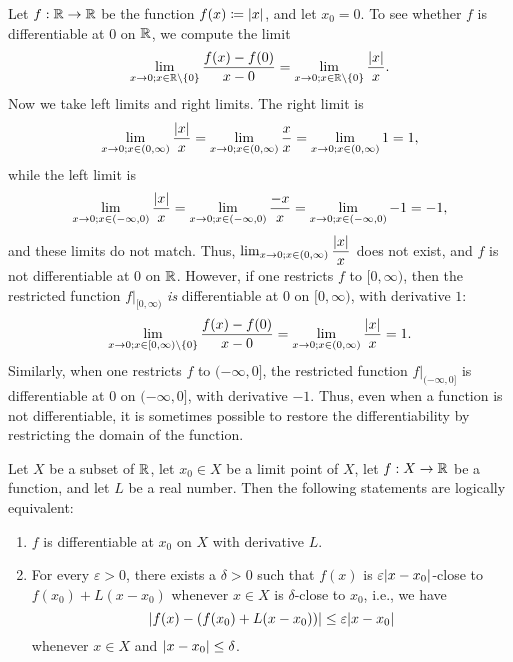 \begin{eg}\label{i:10.1.6}
  Let \(f : \mathbb{R} \to \mathbb{R}\) be the function \(f(x) \coloneqq \left\lvert x\right\rvert\), and let \(x_0 = 0\).
  To see whether \(f\) is differentiable at \(0\) on \(\mathbb{R}\), we compute the limit
  \[
    \lim_{x \to 0 ; x \in \mathbb{R} \setminus \left\lbrace0\right\rbrace} \dfrac{f(x) - f(0)}{x - 0} = \lim_{x \to 0 ; x \in \mathbb{R} \setminus \left\lbrace0\right\rbrace} \dfrac{\left\lvert x\right\rvert}{x}.
  \]
  Now we take left limits and right limits.
  The right limit is
  \[
    \lim_{x \to 0 ; x \in (0, \infty)} \dfrac{\left\lvert x\right\rvert}{x} = \lim_{x \to 0 ; x \in (0, \infty)} \dfrac{x}{x} = \lim_{x \to 0 ; x \in (0, \infty)} 1 = 1,
  \]
  while the left limit is
  \[
    \lim_{x \to 0 ; x \in (-\infty, 0)} \dfrac{\left\lvert x\right\rvert}{x} = \lim_{x \to 0 ; x \in (-\infty, 0)} \dfrac{-x}{x} = \lim_{x \to 0 ; x \in (-\infty, 0)} -1 = -1,
  \]
  and these limits do not match.
  Thus, \(\lim_{x \to 0 ; x \in (0, \infty)} \dfrac{\left\lvert x\right\rvert}{x}\) does not exist, and \(f\) is not differentiable at \(0\) on \(\mathbb{R}\).
  However, if one restricts \(f\) to \([0, \infty)\), then the restricted function \(f|_{[0, \infty)}\) \emph{is} differentiable at \(0\) on \([0, \infty)\), with derivative \(1\):
  \[
  \lim_{x \to 0 ; x \in [0, \infty) \setminus \left\lbrace0\right\rbrace} \dfrac{f(x) - f(0)}{x - 0} = \lim_{x \to 0 ; x \in (0, \infty)} \dfrac{\left\lvert x\right\rvert}{x} = 1.
    \]
    Similarly, when one restricts \(f\) to \((-\infty, 0]\), the restricted function \(f|_{(-\infty, 0]}\) is differentiable at \(0\) on \((-\infty, 0]\), with derivative \(-1\).
  Thus, even when a function is not differentiable, it is sometimes possible to restore the differentiability by restricting the domain of the function.
\end{eg}

\begin{prop}\label{i:10.1.7}
  Let \(X\) be a subset of \(\mathbb{R}\), let \(x_0 \in X\) be a limit point of \(X\), let \(f : X \to \mathbb{R}\) be a function, and let \(L\) be a real number.
  Then the following statements are logically equivalent:
  \begin{enumerate}
    \item \(f\) is differentiable at \(x_0\) on \(X\) with derivative \(L\).
    \item For every \(\varepsilon > 0\), there exists a \(\delta > 0\) such that \(f(x)\) is \(\varepsilon \abs{x - x_0}\)-close to \(f(x_0) + L(x - x_0)\) whenever \(x \in X\) is \(\delta\)-close to \(x_0\), i.e., we have
          \[
            \abs{f(x) - (f(x_0) + L(x - x_0))} \leq \varepsilon \abs{x - x_0}
          \]
          whenever \(x \in X\) and \(\left\lvert x - x_0\right\rvert \leq \delta\).
  \end{enumerate}
\end{prop}

